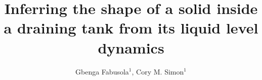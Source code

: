 \documentclass[openacc]{rsproca_new}%
\begin{document}
\title{Inferring the shape of a solid inside a draining tank from its liquid level dynamics}


\author{%
Gbenga Fabusola$^{1}$, 
Cory M. Simon$^{1}$
}

\address{$^{1}$School of Chemical, Biological, and Environmental Engineering. Oregon State University. Corvallis, OR, USA.
}

\subject{applied mathematics, chemical engineering}


\end{document}
